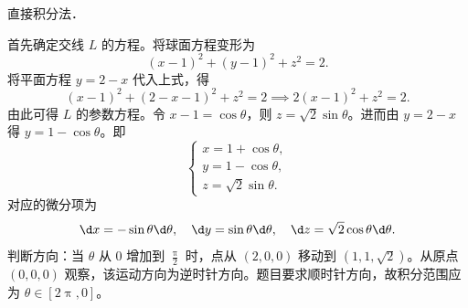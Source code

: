 \begin{solution}
    直接积分法．

    首先确定交线 $L$ 的方程。将球面方程变形为
    \begin{equation}
        (x-1)^2 + (y-1)^2 + z^2 = 2.
    \end{equation}
    将平面方程 $y = 2 - x$ 代入上式，得
    \begin{equation}
        (x-1)^2 + (2-x-1)^2 + z^2 = 2 \implies 2(x-1)^2 + z^2 = 2.
    \end{equation}
    由此可得 $L$ 的参数方程。令 $x - 1 = \cos \theta$，则 $z = \sqrt{2} \sin \theta$。进而由 $y = 2 - x$ 得 $y = 1 - \cos \theta$。即
    \begin{equation}
        \begin{cases}
            x = 1 + \cos \theta, \\
            y = 1 - \cos \theta, \\
            z = \sqrt{2} \sin \theta.
        \end{cases}
    \end{equation}
    对应的微分项为
    \begin{equation}
        \d x = -\sin \theta \d \theta, \quad \d y = \sin \theta \d \theta, \quad \d z = \sqrt{2} \cos \theta \d \theta.
    \end{equation}
    判断方向：当 $\theta$ 从 $0$ 增加到 $\frac{\uppi}{2}$ 时，点从 $(2,0,0)$ 移动到 $(1,1,\sqrt{2})$。从原点 $(0,0,0)$ 观察，该运动方向为逆时针方向。题目要求顺时针方向，故积分范围应为 $\theta \in [2\uppi, 0]$。


\end{solution}

